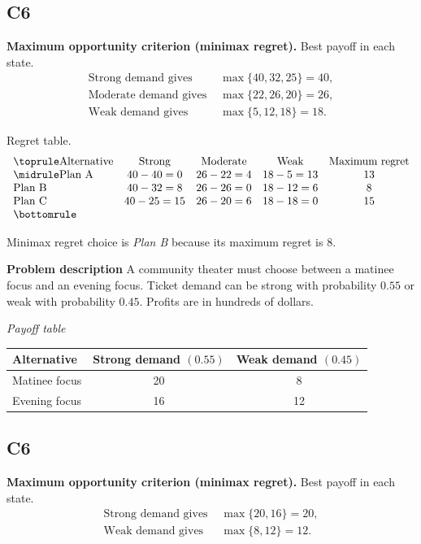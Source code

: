 \begin{ExamProblems}
		\subsection*{C6}
		\textbf{Maximum opportunity criterion (minimax regret).} Best payoff in each state.
		\[
		\begin{aligned}
		\text{Strong demand gives } &\max\{40,32,25\}=40,\\
		\text{Moderate demand gives } &\max\{22,26,20\}=26,\\
		\text{Weak demand gives } &\max\{5,12,18\}=18.
		\end{aligned}
		\]

		Regret table.
		\[
		\begin{array}{lcccc}
			\toprule
			\text{Alternative} & \text{Strong} & \text{Moderate} & \text{Weak} & \text{Maximum regret}\\
			\midrule
			\text{Plan A} & 40-40=0 & 26-22=4 & 18-5=13 & 13\\
			\text{Plan B} & 40-32=8 & 26-26=0 & 18-12=6 & 8\\
			\text{Plan C} & 40-25=15 & 26-20=6 & 18-18=0 & 15\\
			\bottomrule
		\end{array}
		\]

		Minimax regret choice is \emph{Plan B} because its maximum regret is $8$.

		\item
		\textbf{Problem description}
		A community theater must choose between a matinee focus and an evening focus. Ticket demand can be strong with probability $0.55$ or weak with probability $0.45$. Profits are in hundreds of dollars.

		\begin{center}
			\textit{Payoff table}\\
			\begin{tabular}{l c c}
				\toprule
				Alternative & Strong demand $(0.55)$ & Weak demand $(0.45)$ \\
				\midrule
				Matinee focus & 20 & 8 \\
				Evening focus & 16 & 12 \\
				\bottomrule
			\end{tabular}
		\end{center}

		\subsection*{C6}
		\textbf{Maximum opportunity criterion (minimax regret).} Best payoff in each state.
		\[
		\begin{aligned}
		\text{Strong demand gives } &\max\{20,16\}=20,\\
		\text{Weak demand gives } &\max\{8,12\}=12.
		\end{aligned}
		\]


\end{ExamProblems}
